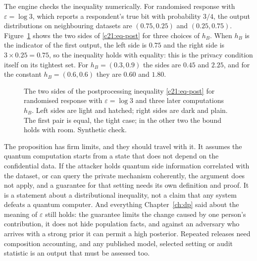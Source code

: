 The engine checks the inequality numerically. For randomised response with $\varepsilon=\log3$, which
reports a respondent's true bit with probability $3/4$, the output distributions on neighbouring
datasets are $(0.75,0.25)$ and $(0.25,0.75)$. Figure~\ref{c21:fig-post} shows the two sides of \eqref{c21:eq-post} for three
choices of $h_B$. When $h_B$ is the indicator of the first output, the left side is $0.75$ and the right
side is $3\times0.25=0.75$, so the inequality holds with equality: this is the privacy condition itself
on its tightest set. For $h_B=(0.3,0.9)$ the sides are $0.45$ and $2.25$, and for the constant
$h_B=(0.6,0.6)$ they are $0.60$ and $1.80$.

\begin{figure}[ht]
\centering
{}
\caption{The two sides of the postprocessing inequality \eqref{c21:eq-post} for randomised response with
$\varepsilon=\log3$ and three later computations $h_B$. Left sides are light and hatched; right sides are dark
and plain. The first pair is equal, the tight case; in the other two the bound holds with room.
Synthetic check.}
\label{c21:fig-post}
\end{figure}

The proposition has firm limits, and they should travel with it. It assumes the quantum
computation starts from a state that does not depend on the confidential data. If the attacker
holds quantum side information correlated with the dataset, or can query the private mechanism
coherently, the argument does not apply, and a guarantee for that setting needs its own definition
and proof. It is a statement about a distributional inequality, not a claim that any system defeats
a quantum computer. And everything Chapter~\ref{ch:dp} said about the meaning of $\varepsilon$ still holds: the
guarantee limits the change caused by one person's contribution, it does not hide population facts,
and against an adversary who arrives with a strong prior it can permit a high posterior. Repeated
releases need composition accounting, and any published model, selected setting or audit statistic
is an output that must be assessed too.


